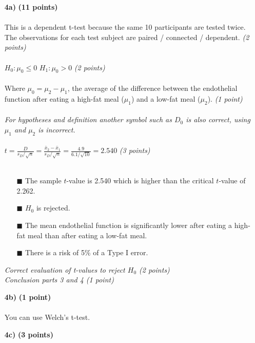 \begin{itemize}
\item[\textbf{4a)}] \textbf{(11 points)} \\ \\
This is a dependent t-test because the same 10 participants are tested twice. The observations for each test subject are paired / connected / dependent. \textit{(2 points)}\\ \\
$H_0: \mu_0 \leq 0$ \hspace{3cm} $H_1: \mu_0 > 0$ \hspace{3cm} \textit{(2 points)} \\ \\
Where $\mu_0 = \mu_2 - \mu_1$, the average of the difference between the endothelial function after eating a high-fat meal ($\mu_1$) and a low-fat meal ($\mu_2$). \textit{(1 point)} \\ \\ 
\textit{For hypotheses and definition another symbol such as $D_0$ is also correct, using $\mu_1$ and $\mu_2$ is incorrect.} \\ \\
$t = \frac{D}{s_D / \sqrt{n}} = \frac{\bar{x}_2 - \bar{x}_1}{s_D / \sqrt{n}} = \frac{4.9}{6.1 / \sqrt{10}} = 2.540$ \textit{(3 points)}\\ \\
        \begin{itemize}
        \item[$\blacksquare$] The sample $t$-value is 2.540 which is higher than the critical $t$-value of 2.262.
        \item[$\blacksquare$] $H_0$ is rejected.
        \item[$\blacksquare$] The mean endothelial function is significantly lower after eating a high-fat meal than after eating a low-fat meal.
\item[$\blacksquare$] There is a risk of 5\% of a Type I error.
        \end{itemize}
        \textit{Correct evaluation of t-values to reject $H_0$ (2 points) \\ Conclusion parts 3 and 4 (1 point)} \\
\item[\textbf{4b)}] \textbf{(1 point)} \\ \\
You can use Welch’s t-test. \\
\item[\textbf{4c)}] \textbf{(3 points)} \\

\end{itemize}
